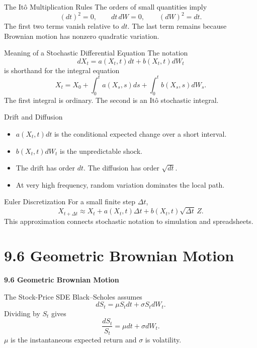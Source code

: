 \documentclass[aspectratio=169]{beamer}
\begin{document}
\begin{frame}[t]{The It\^o Multiplication Rules}
\justifying
The orders of small quantities imply
\[(dt)^2=0,\qquad dt\,dW=0,\qquad (dW)^2=dt.\]
The first two terms vanish relative to $dt$. The last term remains because Brownian motion has nonzero quadratic variation.
\end{frame}

\begin{frame}[t]{Meaning of a Stochastic Differential Equation}
\justifying
The notation
\[dX_t=a(X_t,t)dt+b(X_t,t)dW_t\]
is shorthand for the integral equation
\[X_t=X_0+\int_0^t a(X_s,s)ds+\int_0^t b(X_s,s)dW_s.\]
The first integral is ordinary. The second is an It\^o stochastic integral.
\end{frame}

\begin{frame}[t]{Drift and Diffusion}
\justifying
\begin{itemize}
\item $a(X_t,t)dt$ is the conditional expected change over a short interval.
\item $b(X_t,t)dW_t$ is the unpredictable shock.
\item The drift has order $dt$. The diffusion has order $\sqrt{dt}$.
\item At very high frequency, random variation dominates the local path.
\end{itemize}
\end{frame}

\begin{frame}[t]{Euler Discretization}
\justifying
For a small finite step $\Delta t$,
\[X_{t+\Delta t}\approx X_t+a(X_t,t)\Delta t+b(X_t,t)\sqrt{\Delta t}\,Z.\]
This approximation connects stochastic notation to simulation and spreadsheets.
\end{frame}

\section{9.6 Geometric Brownian Motion}
\begin{frame}[plain]
\centering\vfill
{\color{TitleBlue}\Large\bfseries 9.6 Geometric Brownian Motion}\par
\vspace{0.5cm}{\large The stock-price process used in Black--Scholes}\par
\vfill\end{frame}

\begin{frame}[t]{The Stock-Price SDE}
\justifying
Black--Scholes assumes
\[dS_t=\mu S_tdt+\sigma S_tdW_t.\]
Dividing by $S_t$ gives
\[\frac{dS_t}{S_t}=\mu dt+\sigma dW_t.\]
$\mu$ is the instantaneous expected return and $\sigma$ is volatility.
\end{frame}
\end{document}
